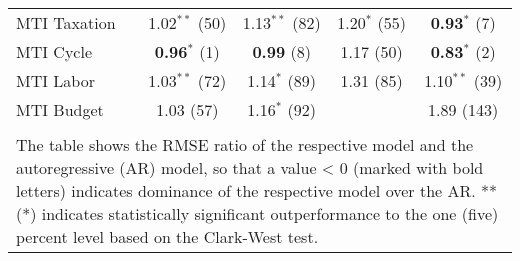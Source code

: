 \begin{table}[!htbp]
\begin{tabular}{@{\extracolsep{5pt}} lcccc}
MTI Taxation & 1.02$^{**}$ (50) & 1.13$^{**}$ (82) & 1.20$^{*}$ (55) & \textbf{0.93$^{*}$} (7) \\ 
MTI Cycle & \textbf{0.96$^{*}$} (1) & \textbf{0.99} (8) & 1.17 (50) & \textbf{0.83$^{*}$} (2) \\ 
MTI Labor & 1.03$^{**}$ (72) & 1.14$^{*}$ (89) & 1.31 (85) & 1.10$^{**}$ (39) \\ 
MTI Budget & 1.03 (57) & 1.16$^{*}$ (92) &  & 1.89 (143) \\ 
\hline \\[-1.8ex] 
\multicolumn{5}{l}{The table shows the RMSE ratio of the 
              respective model and the autoregressive (AR) model,
              so that a value < 0 (marked with bold letters) 
              indicates dominance of the respective model over 
              the AR. ** (*) indicates 
              statistically significant outperformance 
              to the one (five) percent level based on the Clark-West test.} \\ 
\end{tabular} 
\end{table} 
